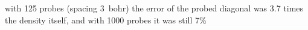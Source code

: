 with 125 probes (spacing 3~bohr) the error of the probed diagonal was 3.7 times the density itself, and with 1000 probes it was still 7\%